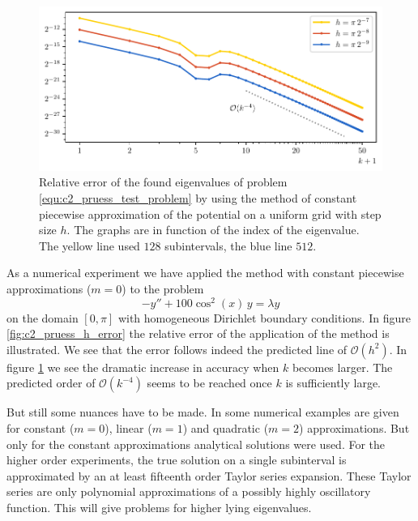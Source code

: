 \begin{figure}
    \begin{center}
        \includegraphics[width=\textwidth]{img/chapter2/pruess_k_error.pdf}
    \end{center}
    \caption{Relative error of the found eigenvalues of problem \eqref{equ:c2_pruess_test_problem} by using the method of constant piecewise approximation of the potential on a uniform grid with step size $h$. The graphs are in function of the index of the eigenvalue. The yellow line used $128$ subintervals, the blue line $512$.}
    \label{fig:c2_pruess_k_error}
\end{figure}

As a numerical experiment we have applied the method with constant piecewise approximations ($m=0$) to the problem
\begin{equation}\label{equ:c2_pruess_test_problem}
    -y'' + 100 \cos^2(x) \,y = \lambda y
\end{equation}
on the domain $[0, \pi]$ with homogeneous Dirichlet boundary conditions. In figure \ref{fig:c2_pruess_h_error} the relative error of the application of the method is illustrated. We see that the error follows indeed the predicted line of $\mathcal{O}(h^2)$. In figure \ref{fig:c2_pruess_k_error} we see the dramatic increase in accuracy when $k$ becomes larger. The predicted order of $\mathcal{O}(k^{-4})$ seems to be reached once $k$ is sufficiently large.


But still some nuances have to be made. In \cite{pruess_estimating_1973} some numerical examples are given for constant ($m=0$), linear ($m=1$) and quadratic ($m=2$) approximations. But only for the constant approximations analytical solutions were used. For the higher order experiments, the true solution on a single subinterval is approximated by an at least fifteenth order Taylor series expansion. These Taylor series are only polynomial approximations of a possibly highly oscillatory function. This will give problems for higher lying eigenvalues.


